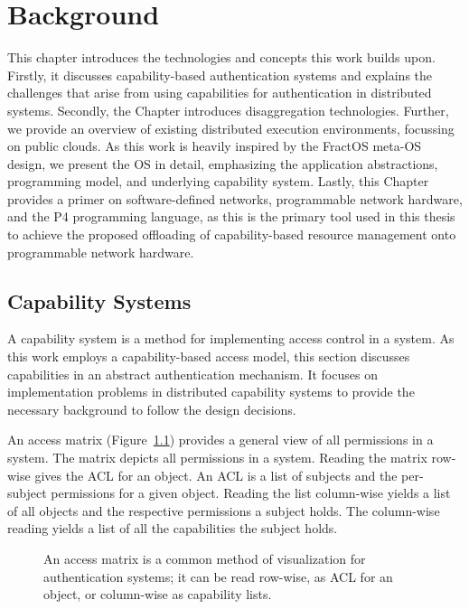 %
\chapter{Background}%
\thispagestyle{scrheadings}
\label{sec:background}\label{chap:background}

%
%
%
This chapter introduces the technologies and concepts this work builds upon. Firstly, it discusses capability-based authentication systems and explains the challenges that arise from using capabilities for authentication in distributed systems. Secondly, the Chapter introduces disaggregation technologies. Further, we provide an overview of existing distributed execution environments, focussing on public clouds. As this work is heavily inspired by the FractOS meta-\ac{OS} design, we present the \ac{OS} in detail, emphasizing the application abstractions, programming model, and underlying capability system. Lastly, this Chapter provides a primer on software-defined networks, programmable network hardware, and the P4 programming language, as this is the primary tool used in this thesis to achieve the proposed offloading of capability-based resource management onto programmable network hardware.

\section{Capability Systems}
A capability system is a method for implementing access control in a system. As this work employs a capability-based access model, this section discusses capabilities in an abstract authentication mechanism. It focuses on implementation problems in distributed capability systems to provide the necessary background to follow the design decisions.

An access matrix (Figure~\ref{fig:cap-system}) provides a general view of all permissions in a system. The matrix depicts all permissions in a system. Reading the matrix row-wise gives the \ac{ACL} for an object. An \ac{ACL} is a list of subjects and the per-subject permissions for a given object. Reading the list column-wise yields a list of all objects and the respective permissions a subject holds. The column-wise reading yields a list of all the capabilities the subject holds.

\begin{figure}[H]
  \centering
  
  \caption{\label{fig:cap-system} An access matrix is a common method of visualization for authentication systems; it can be read row-wise, as \ac{ACL} for an object, or column-wise as capability lists.}
\end{figure}

